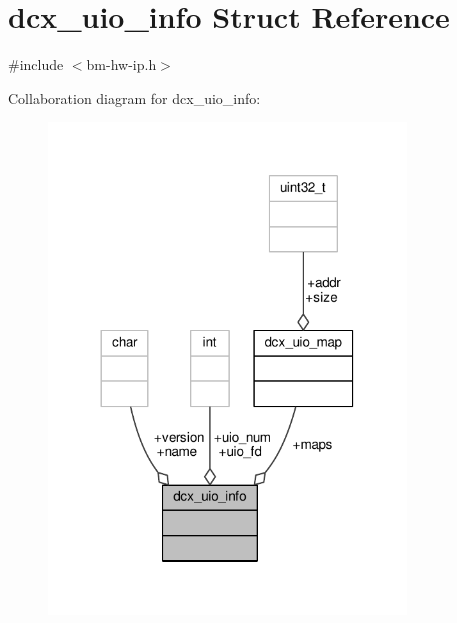 \hypertarget{structdcx__uio__info}{}\section{dcx\+\_\+uio\+\_\+info Struct Reference}
\label{structdcx__uio__info}


{\ttfamily \#include $<$bm-\/hw-\/ip.\+h$>$}



Collaboration diagram for dcx\+\_\+uio\+\_\+info\+:
\nopagebreak
\begin{figure}[H]
\begin{center}
\leavevmode
\includegraphics[width=269pt]{structdcx__uio__info__coll__graph}
\end{center}
\end{figure}
